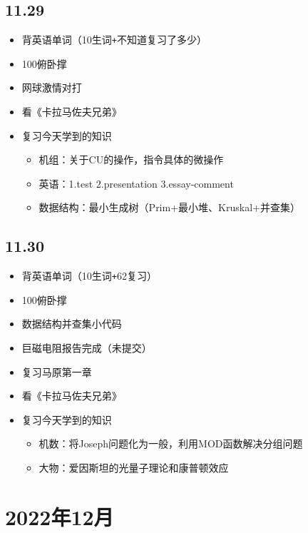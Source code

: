 \documentclass[UTF8]{ctexart}
\begin{document}
\subsection*{11.29}
\begin{itemize}
    \item 背英语单词（10生词\verb|+|不知道复习了多少）
    \item 100俯卧撑
    \item 网球激情对打
    \item 看《卡拉马佐夫兄弟》
    \item 复习今天学到的知识
          \begin{itemize}
              \item 机组：关于CU的操作，指令具体的微操作
              \item 英语：1.test 2.presentation 3.essay-comment
              \item 数据结构：最小生成树（Prim+最小堆、Kruskal+并查集）
          \end{itemize}
\end{itemize}
\subsection*{11.30}
\begin{itemize}
    \item 背英语单词（10生词\verb|+|62复习）
    \item 100俯卧撑
    \item 数据结构并查集小代码
    \item 巨磁电阻报告完成（未提交）
    \item 复习马原第一章
    \item 看《卡拉马佐夫兄弟》
    \item 复习今天学到的知识
          \begin{itemize}
              \item 机数：将Joseph问题化为一般，利用MOD函数解决分组问题
              \item 大物：爱因斯坦的光量子理论和康普顿效应
          \end{itemize}
\end{itemize}
\section*{2022年12月}
\end{document}
